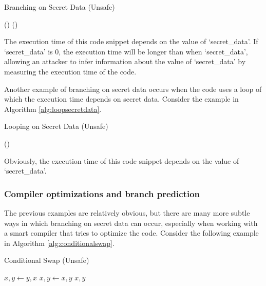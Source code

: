 \documentclass[11pt,a4paper]{report}
\theoremstyle{definition}
\begin{document}
\begin{algorithm}
  \caption{Branching on Secret Data (Unsafe)}
  \label{alg:branchingsecretdata}
  \begin{algorithmic}[1]
      \State {}() 
    \Else
      \State {}() 
    \EndIf
  \end{algorithmic}
\end{algorithm}

The execution time of this code snippet depends on the value of `secret\_data'. If `secret\_data' is 0, the execution time will be longer than when `secret\_data', allowing an attacker to infer information about the value of `secret\_data' by measuring the execution time of the code.

Another example of branching on secret data occurs when the code uses a loop of which the execution time depends on secret data. Consider the example in Algorithm \ref{alg:loopsecretdata}.

\begin{algorithm}
  \caption{Looping on Secret Data (Unsafe)}
  \label{alg:loopsecretdata}
  \begin{algorithmic}[1]
      \State {}()
    \EndFor
  \end{algorithmic}
\end{algorithm}

Obviously, the execution time of this code snippet depends on the value of `secret\_data'.

\subsubsection{Compiler optimizations and branch prediction}
The previous examples are relatively obvious, but there are many more subtle ways in which branching on secret data can occur, especially when working with a smart compiler that tries to optimize the code. Consider the following example in Algorithm \ref{alg:conditionalswap}.

\begin{algorithm}
  \caption{Conditional Swap (Unsafe)}
  \label{alg:conditionalswap}
  \begin{algorithmic}[1]
        \State $x, y \gets y, x$
      \Else
        \State $x, y \gets x, y$
      \EndIf
      \State \Return $x, y$
    \EndFunction
  \end{algorithmic}
\end{algorithm}
\end{document}
